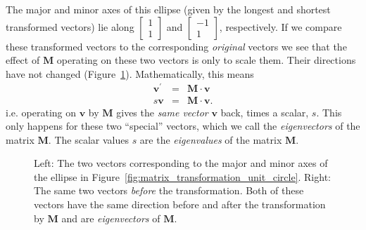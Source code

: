 \documentclass[a4paper]{article}
\newcommand{\bvec}[1]{\boldsymbol{\mathbf{#1}}}
\newcommand{\cvec}[2]{\begin{bmatrix}#1\\#2\end{bmatrix}}
\begin{document}
The major and minor axes of this ellipse (given by the longest and shortest transformed vectors) lie along $\cvec{1}{1}$ and $\cvec{-1}{1}$, respectively. If we compare these transformed vectors to the corresponding \emph{original} vectors we see that the effect of $\bvec{M}$ operating on these two vectors is only to scale them. Their directions have not changed (Figure~\ref{fig:ellipse_major_minor_axes_transformation}). Mathematically, this means
\begin{eqnarray*}
\bvec{v^\prime}&=&\bvec{M}\cdot\bvec{v} \\
s\bvec{v}&=&\bvec{M}\cdot\bvec{v}.
\end{eqnarray*}
i.e. operating on $\bvec{v}$ by $\bvec{M}$ gives the \emph{same vector} $\bvec{v}$ back, times a scalar, $s$. This only happens for these two ``special'' vectors, which we call the \emph{eigenvectors} of the matrix $\bvec{M}$. The scalar values $s$ are the \emph{eigenvalues} of the matrix $\bvec{M}$.

\begin{figure}[tb]
  \centering
    \caption{\label{fig:ellipse_major_minor_axes_transformation}Left: The two vectors corresponding to the major and minor axes of the ellipse in Figure~\ref{fig:matrix_transformation_unit_circle}. Right: The same two vectors \emph{before} the transformation. Both of these vectors have the same direction before and after the transformation by $\bvec{M}$ and are \emph{eigenvectors} of $\bvec{M}$.}
\end{figure}
\end{document}
